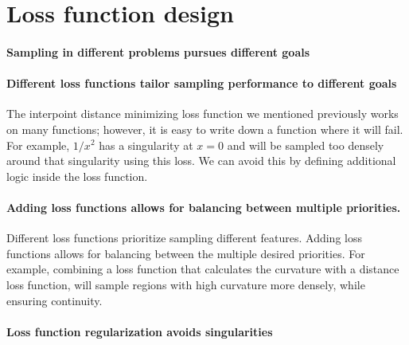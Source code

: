 \documentclass[english, twocolumn, 10pt, aps, superscriptaddress, floatfix, prb, citeautoscript]{revtex4-1}
\begin{document}
\hypertarget{loss-function-design}{%
\section{Loss function design}\label{loss-function-design}}

\hypertarget{sampling-in-different-problems-pursues-different-goals}{%
\paragraph{Sampling in different problems pursues different goals}\label{sampling-in-different-problems-pursues-different-goals}}

\hypertarget{different-loss-functions-tailor-sampling-performance-to-different-goals}{%
\paragraph{Different loss functions tailor sampling performance to different goals}\label{different-loss-functions-tailor-sampling-performance-to-different-goals}}

The interpoint distance minimizing loss function we mentioned previously works on many functions; however, it is easy to write down a function where it will fail.
For example, \(1/x^2\) has a singularity at \(x=0\) and will be sampled too densely around that singularity using this loss.
We can avoid this by defining additional logic inside the loss function.

\hypertarget{adding-loss-functions-allows-for-balancing-between-multiple-priorities.}{%
\paragraph{Adding loss functions allows for balancing between multiple priorities.}\label{adding-loss-functions-allows-for-balancing-between-multiple-priorities.}}

Different loss functions prioritize sampling different features.
Adding loss functions allows for balancing between the multiple desired priorities.
For example, combining a loss function that calculates the curvature with a distance loss function, will sample regions with high curvature more densely, while ensuring continuity.

\hypertarget{loss-function-regularization-avoids-singularities}{%
\paragraph{Loss function regularization avoids singularities}\label{loss-function-regularization-avoids-singularities}}
\end{document}
